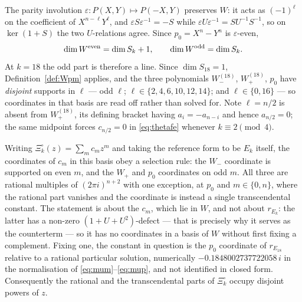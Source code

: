 \documentclass[11pt]{article}
\begin{document}
The parity involution $\varepsilon:P(X,Y)\mapsto P(-X,Y)$ preserves $W$: it acts as $(-1)^\ell$ on
the coefficient of $X^{n-\ell}Y^\ell$, and $\varepsilon S\varepsilon^{-1}=-S$ while
$\varepsilon U\varepsilon^{-1}=SU^{-1}S^{-1}$, so on $\ker(1+S)$ the two $U$-relations agree. Since
$p_0=X^n-Y^n$ is $\varepsilon$-even,
\begin{equation}\label{eq:parity}
\dim W^{\rm even}=\dim S_k+1,\qquad \dim W^{\rm odd}=\dim S_k .
\end{equation}
At $k=18$ the odd part is therefore a line. Since $\dim S_{18}=1$, Definition~\ref{def:Wpm}
applies, and the three polynomials $W^{(18)}_-$, $W^{(18)}_+$, $p_0$ have \emph{disjoint} supports
in $\ell$ --- odd $\ell$; $\ell\in\{2,4,6,10,12,14\}$; and $\ell\in\{0,16\}$ --- so coordinates in
that basis are read off rather than solved for. Note $\ell=n/2$ is absent from $W^{(18)}_+$, its
defining bracket having $a_i=-a_{n-i}$ and hence $a_{n/2}=0$; the same midpoint forces
$c_{n/2}=0$ in \eqref{eq:thetafe} whenever $k\equiv2\pmod4$.

Writing $\Xi^\circ_k(z)=\sum_m c_m z^m$ and taking the reference form to be $E_k$ itself, the
coordinates of $c_m$ in this basis obey a selection rule: the $W_-$ coordinate is supported on
even $m$, and the $W_+$ and $p_0$ coordinates on odd $m$. All three are rational multiples of
$(2\pi i)^{n+2}$ with one exception, at $p_0$ and $m\in\{0,n\}$, where the rational part vanishes and
the coordinate is instead a single transcendental constant. The statement is about the $c_m$, which
lie in $W$, and not about $r_{E_k}$: the latter has a non-zero $(1+U+U^2)$-defect --- that is
precisely why it serves as the counterterm --- so it has no coordinates in a basis of $W$ without
first fixing a complement. Fixing one, the constant in question is the $p_0$ coordinate of
$r_{E_{18}}$ relative to a rational particular solution, numerically
$-0.1848002737722058\,i$ in the normalisation of \eqref{eq:mum}--\eqref{eq:mup}, and not identified
in closed form. Consequently the rational and the transcendental parts of $\Xi^\circ_k$ occupy
disjoint powers of $z$.
\end{document}

